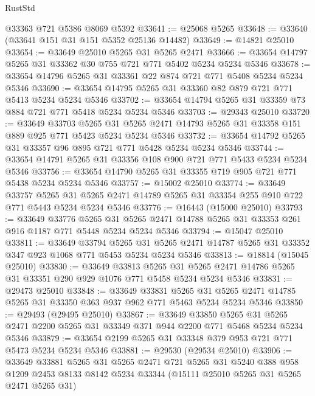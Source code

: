 \begin{lexlean}{RustStd}
\begin{coremodule}
    @33363
    @721
    @5386
    @8069
    @5392
@33641 := @25068 @5265
@33648 := @33640 (@33641 @151 @31 @151 @5352 @25136 @14482)
@33649 := @14821 @25010
@33654 := @33649 @25010 @5265 @31 @5265 @2471
@33666 := @33654 @14797 @5265 @31 @33362 @30 @755 @721 @771 @5402 @5234 @5234 @5346
@33678 := @33654 @14796 @5265 @31 @33361 @22 @874 @721 @771 @5408 @5234 @5234 @5346
@33690 := @33654 @14795 @5265 @31 @33360 @82 @879 @721 @771 @5413 @5234 @5234 @5346
@33702 := @33654 @14794 @5265 @31 @33359 @73 @884 @721 @771 @5418 @5234 @5234 @5346
@33703 := @29343 @25010
@33720 := @33649
    @33703
    @5265
    @31
    @5265
    @2471
    @14793
    @5265
    @31
    @33358
    @151
    @889
    @925
    @771
    @5423
    @5234
    @5234
    @5346
@33732 := @33654 @14792 @5265 @31 @33357 @96 @895 @721 @771 @5428 @5234 @5234 @5346
@33744 := @33654 @14791 @5265 @31 @33356 @108 @900 @721 @771 @5433 @5234 @5234 @5346
@33756 := @33654 @14790 @5265 @31 @33355 @719 @905 @721 @771 @5438 @5234 @5234 @5346
@33757 := @15002 @25010
@33774 := @33649
    @33757
    @5265
    @31
    @5265
    @2471
    @14789
    @5265
    @31
    @33354
    @255
    @910
    @722
    @771
    @5443
    @5234
    @5234
    @5346
@33776 := @16443 (@15000 @25010)
@33793 := @33649
    @33776
    @5265
    @31
    @5265
    @2471
    @14788
    @5265
    @31
    @33353
    @261
    @916
    @1187
    @771
    @5448
    @5234
    @5234
    @5346
@33794 := @15047 @25010
@33811 := @33649
    @33794
    @5265
    @31
    @5265
    @2471
    @14787
    @5265
    @31
    @33352
    @347
    @923
    @1068
    @771
    @5453
    @5234
    @5234
    @5346
@33813 := @18814 (@15045 @25010)
@33830 := @33649
    @33813
    @5265
    @31
    @5265
    @2471
    @14786
    @5265
    @31
    @33351
    @290
    @929
    @1076
    @771
    @5458
    @5234
    @5234
    @5346
@33831 := @29473 @25010
@33848 := @33649
    @33831
    @5265
    @31
    @5265
    @2471
    @14785
    @5265
    @31
    @33350
    @363
    @937
    @962
    @771
    @5463
    @5234
    @5234
    @5346
@33850 := @29493 (@29495 @25010)
@33867 := @33649
    @33850
    @5265
    @31
    @5265
    @2471
    @2200
    @5265
    @31
    @33349
    @371
    @944
    @2200
    @771
    @5468
    @5234
    @5234
    @5346
@33879 := @33654 @2199 @5265 @31 @33348 @379 @953 @721 @771 @5473 @5234 @5234 @5346
@33881 := @29530 (@29534 @25010)
@33906 := @33649
    @33881
    @5265
    @31
    @5265
    @2471
    @721
    @5265
    @31
    @5240
    @388
    @958
    @1209
    @2453
    @8133
    @8142
    @5234
    @33344
    (@15111 @25010 @5265 @31 @5265 @2471 @5265 @31)

\end{coremodule}
\end{lexlean}

